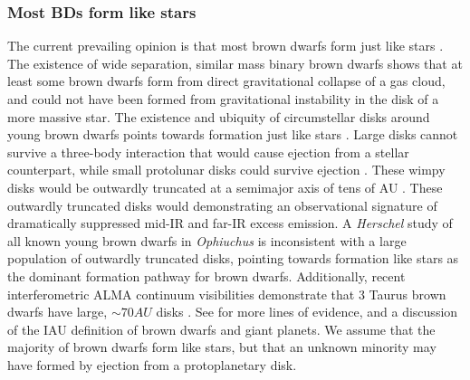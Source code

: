 \documentclass[12pt,preprint]{aastex}
\begin{document}
\subsubsection{Most BDs form like stars}
The current prevailing opinion is that most brown dwarfs form just like stars \citep{2014prpl.conf..619C}.  The existence of wide separation, similar mass binary brown dwarfs \citep{2004ApJ...614..398L,2006PhDT.........2A,2007ApJ...660.1492C,2009ApJ...691.1265L} shows that at least some brown dwarfs form from direct gravitational collapse of a gas cloud, and could not have been formed from gravitational instability in the disk of a more massive star.  The existence and ubiquity of circumstellar disks around young brown dwarfs points towards formation just like stars \citep{2005ApJ...635L..93L,allers06,2012ARA&A..50...65L, 2013A&A...559A.126A}.  Large disks cannot survive a three-body interaction that would cause ejection from a stellar counterpart, while small protolunar disks could survive ejection \citep{2009MNRAS.392..413S}.  These wimpy disks would be outwardly truncated at a semimajor axis of tens of AU \citep{2009MNRAS.392..413S}.  These outwardly truncated disks would demonstrating an observational signature of dramatically suppressed mid-IR and far-IR excess emission.  A \emph{Herschel} study of all known young brown dwarfs in \emph{Ophiuchus} \citep{2013A&A...559A.126A} is inconsistent with a large population of outwardly truncated disks, pointing towards formation like stars as the dominant formation pathway for brown dwarfs.  Additionally, recent interferometric ALMA continuum visibilities demonstrate that 3 Taurus brown dwarfs have large, $\sim70 AU$ disks \citep{2014ApJ...791...20R}.  See \citet{2014prpl.conf..619C} for more lines of evidence, and a discussion of the IAU definition of brown dwarfs and giant planets.  We assume that the majority of brown dwarfs form like stars, but that an unknown minority may have formed by ejection from a protoplanetary disk.
\end{document}
